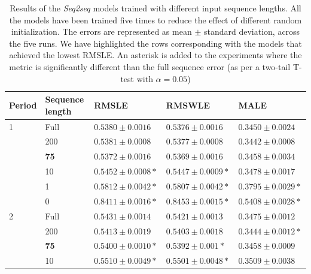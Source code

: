 	\begin{table}[h]
	\footnotesize
	\caption{Results of the \textit{Seq2seq} models trained with different input sequence lengths. All the models have been trained five times to reduce the effect of different random initialization. The errors are represented as mean $\pm$ standard deviation, across the five runs. We have highlighted the rows corresponding with the models that achieved the lowest RMSLE. An asterisk is added to the experiments where the metric is significantly different than the full sequence error (as per a two-tail T-test with $\alpha=0.05$)}
	\label{tab:salesforecast_results_ablation_length}
	\centering
	\begin{tabular}{lllll}
		\hline
		Period & Sequence length & RMSLE                           & RMSWLE                         & MALE                           \\ \hline
		1      & Full            & $ 0.5380 \pm 0.0016 $           & $ 0.5376 \pm 0.0016 $          & $  0.3450 \pm 0.0024$          \\
      & 200             & $ 0.5381 \pm 0.0008 $           & $ 0.5377 \pm 0.0008 $          & $ 0.3442 \pm 0.0008 $          \\
      & \textbf{75}     & $ \mathbf{0.5372 \pm 0.0016} $  & $ \mathbf{0.5369 \pm 0.0016} $ & $ \mathbf{0.3458 \pm 0.0034} $ \\
      & 10              & $ 0.5452 \pm 0.0008 *$          & $ 0.5447 \pm 0.0009 *$         & $ 0.3478 \pm 0.0017 $          \\
      & 1               & $ 0.5812 \pm 0.0042 *$          & $ 0.5807 \pm 0.0042 *$         & $ 0.3795 \pm 0.0029 *$          \\
      & 0               & $ 0.8411 \pm 0.0016 *$          & $ 0.8453 \pm 0.0015 *$         & $ 0.5408 \pm 0.0028 *$          \\ \hline
		2      & Full            & $ 0.5431 \pm 0.0014 $           & $ 0.5421 \pm 0.0013 $          & $ 0.3475 \pm 0.0012 $          \\
      & 200             & $ 0.5413 \pm 0.0019 $           & $ 0.5403 \pm 0.0018 $          & $ 0.3444 \pm 0.0012 *$          \\
      & \textbf{75}     & $ \mathbf{0.5400 \pm 0.0010}* $ & $ \mathbf{0.5392 \pm 0.001}* $ & $ \mathbf{0.3458 \pm 0.0009} $ \\
      & 10              & $ 0.5510 \pm 0.0049 *$          & $ 0.5501 \pm 0.0048 *$         & $ 0.3509 \pm 0.0038 $          \\

\end{tabular}
\end{table}
